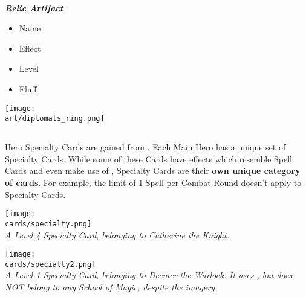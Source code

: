 \begin{multicols*}{2}
\begin{multicols*}{2}
\begin{center}
\begin{scriptsize}
    \end{scriptsize}\\
    \phantom{\ldots}\textbf{\textit{\textcolor{darkcandyapplered}{Relic Artifact}}}
  \end{center}
\end{multicols*}
\begin{multicols}{2}
  \footnotesize
  \begin{itemize}
    \item[\textbf{1.}] Name
    \item[\textbf{2.}] Effect
    \columnbreak
    \item[\textbf{3.}] Level
    \item[\textbf{4.}] Fluff
  \end{itemize}
\end{multicols}

\begin{center}
  \vspace*{\fill}
  {\texttt{[image: \\art/diplomats\_ring.png]}}
  \vspace*{\fill}
\end{center}

\columnbreak
\subsection*{}

Hero Specialty Cards are gained from .
Each Main Hero has a unique set of Specialty Cards.
While some of these Cards have effects which resemble Spell Cards and even make use of , Specialty Cards are their \textbf{own unique category of cards}.
For example, the limit of 1 Spell per Combat Round doesn't apply to Specialty Cards.

{
  \medskip
  \centering
  \texttt{[image: \\cards/specialty.png]}\\
  \medskip
  \footnotesize\textit{A Level 4 Specialty Card, belonging to Catherine the Knight.}
}

{
  \medskip
  \centering
  \texttt{[image: \\cards/specialty2.png]}\\
  \medskip
  \footnotesize\textit{A Level 1 Specialty Card, belonging to Deemer the Warlock. It uses , but does NOT belong to any School of Magic, despite the imagery.}
}


\end{multicols*}
